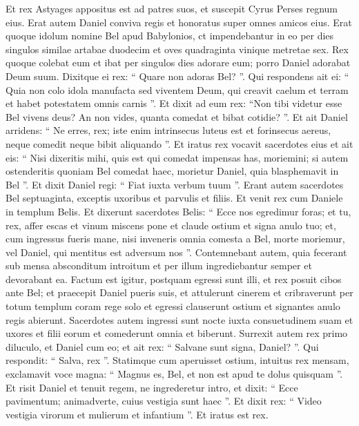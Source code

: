 \begin{biblechapter}
\begin{biblechapter}
\begin{biblechapter}
\begin{biblechapter}
\begin{biblechapter}
\begin{biblechapter}
\begin{biblechapter}
\begin{biblechapter}
\begin{biblechapter}
\begin{biblechapter}
\begin{biblechapter}
\begin{biblechapter}
\begin{biblechapter}
\begin{biblechapter}
\verse Et rex Astyages appositus est ad patres suos, et suscepit Cyrus Perses regnum eius.
 \verse Erat autem Daniel conviva regis et honoratus super omnes amicos eius. 
\verse Erat quoque idolum nomine Bel apud Babylonios, ct impendebantur in eo per dies singulos similae artabae duodecim et oves quadraginta vinique metretae sex. 
 \verse Rex quoque colebat eum et ibat per singulos dies adorare eum; porro Daniel adorabat Deum suum. Dixitque ei rex: “ Quare non adoras Bel? ”. 
\verse Qui respondens ait ei: “ Quia non colo idola manufacta sed viventem Deum, qui creavit caelum et terram et habet potestatem omnis carnis ”. 
\verse Et dixit ad eum rex: “Non tibi videtur esse Bel vivens deus? An non vides, quanta comedat et bibat cotidie? ”. 
\verse Et ait Daniel arridens: “ Ne erres, rex; iste enim intrinsecus luteus est et forinsecus aereus, neque comedit neque bibit aliquando ”. 
\verse Et iratus rex vocavit sacerdotes eius et ait eis: “ Nisi dixeritis mihi, quis est qui comedat impensas has, moriemini; 
\verse si autem ostenderitis quoniam Bel comedat haec, morietur Daniel, quia blasphemavit in Bel ”. Et dixit Daniel regi: “ Fiat iuxta verbum tuum ”. 
\verse Erant autem sacerdotes Bel septuaginta, exceptis uxoribus et parvulis et filiis. Et venit rex cum Daniele in templum Belis. 
\verse Et dixerunt sacerdotes Belis: “ Ecce nos egredimur foras; et tu, rex, affer escas et vinum miscens pone et claude ostium et signa anulo tuo; 
\verse et, cum ingressus fueris mane, nisi inveneris omnia comesta a Bel, morte moriemur, vel Daniel, qui mentitus est adversum nos ”. 
\verse Contemnebant autem, quia fecerant sub mensa absconditum introitum et per illum ingrediebantur semper et devorabant ea. 
\verse Factum est igitur, postquam egressi sunt illi, et rex posuit cibos ante Bel; et praecepit Daniel pueris suis, et attulerunt cinerem et cribraverunt per totum templum coram rege solo et egressi clauserunt ostium et signantes anulo regis abierunt. 
\verse Sacerdotes autem ingressi sunt nocte iuxta consuetudinem suam et uxores et filii eorum et comederunt omnia et biberunt. 
\verse Surrexit autem rex primo diluculo, et Daniel cum eo; 
\verse et ait rex: “ Salvane sunt signa, Daniel? ”. Qui respondit: “ Salva, rex ”. 
\verse Statimque cum aperuisset ostium, intuitus rex mensam, exclamavit voce magna: “ Magnus es, Bel, et non est apud te dolus quisquam ”. 
\verse Et risit Daniel et tenuit regem, ne ingrederetur intro, et dixit: “ Ecce pavimentum; animadverte, cuius vestigia sunt haec ”. 
\verse Et dixit rex: “ Video vestigia virorum et mulierum et infantium ”. Et iratus est rex. 

\end{biblechapter}
\end{biblechapter}
\end{biblechapter}
\end{biblechapter}
\end{biblechapter}
\end{biblechapter}
\end{biblechapter}
\end{biblechapter}
\end{biblechapter}
\end{biblechapter}
\end{biblechapter}
\end{biblechapter}
\end{biblechapter}
\end{biblechapter}
